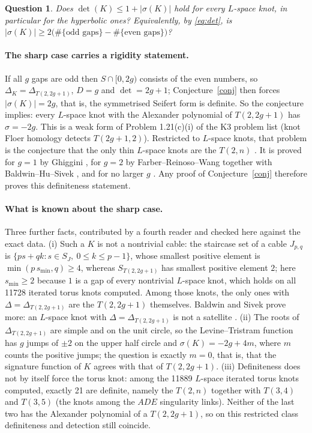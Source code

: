 \documentclass[11pt]{article}
\newtheorem{question}{Question}
\theoremstyle{definition}
\begin{document}
\begin{question}
Does $\det(K) \le 1 + |\sigma(K)|$ hold for every $L$-space knot, in particular for the hyperbolic ones? Equivalently,
by \eqref{eq:det}, is $|\sigma(K)| \ge 2\bigl(\#\{\text{odd gaps}\} - \#\{\text{even gaps}\}\bigr)$?
\end{question}

\paragraph{The sharp case carries a rigidity statement.} If all $g$ gaps are odd then $S \cap [0,2g)$ consists of the
even numbers, so $\Delta_K = \Delta_{T(2,2g+1)}$, $D = g$ and $\det = 2g+1$; Conjecture~\ref{conj} then forces
$|\sigma(K)| = 2g$, that is, the symmetrised Seifert form is definite. So the conjecture implies: every $L$-space knot
with the Alexander polynomial of $T(2,2g+1)$ has $\sigma = -2g$. This is a weak form of Problem 1.21(c)(i) of the K3
problem list \cite{K3} (knot Floer homology detects $T(2g+1,2)$). Restricted to $L$-space knots, that problem is the
conjecture that the only thin $L$-space knots are the $T(2,n)$ \cite[\S1]{DeYeso}. It is proved for $g = 1$ by
Ghiggini \cite{Ghiggini}, for $g = 2$ by Farber--Reinoso--Wang \cite{FRW} together with Baldwin--Hu--Sivek \cite{BHS},
and for no larger $g$ \cite[\S1.1]{BS}. Any proof of Conjecture~\ref{conj} therefore proves this definiteness
statement.

\paragraph{What is known about the sharp case.} Three further facts, contributed by a fourth reader and checked here
against the exact data. (i) Such a $K$ is not a nontrivial cable: the staircase set of a cable $J_{p,q}$ is
$\{ps + qk : s \in S_J,\ 0 \le k \le p-1\}$, whose smallest positive element is $\min(p\,s_{\min}, q) \ge 4$, whereas
$S_{T(2,2g+1)}$ has smallest positive element $2$; here $s_{\min} \ge 2$ because $1$ is a gap of every nontrivial
$L$-space knot, which holds on all 11728 iterated torus knots computed. Among those knots, the only ones with
$\Delta = \Delta_{T(2,2g+1)}$ are the $T(2,2g+1)$ themselves. Baldwin and Sivek prove more: an $L$-space knot with
$\Delta = \Delta_{T(2,2g+1)}$ is not a satellite \cite[Proposition 6.8]{BS}. (ii) The roots of $\Delta_{T(2,2g+1)}$ are simple and on
the unit circle, so the Levine--Tristram function has $g$ jumps of $\pm 2$ on the upper half circle and
$\sigma(K) = -2g + 4m$, where $m$ counts the positive jumps; the question is exactly $m = 0$, that is, that the
signature function of $K$ agrees with that of $T(2,2g+1)$. (iii) Definiteness does not by itself force the torus knot:
among the 11889 $L$-space iterated torus knots computed, exactly 21 are definite, namely the $T(2,n)$ together with
$T(3,4)$ and $T(3,5)$ (the knots among the $ADE$ singularity links). Neither of the last two has the Alexander
polynomial of a $T(2,2g+1)$, so on this restricted class definiteness and detection still coincide.
\end{document}
